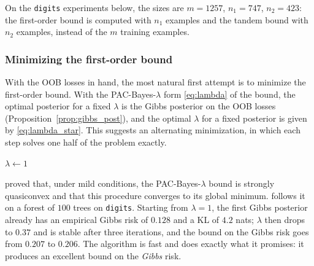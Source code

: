 On the \texttt{digits} experiments below, the sizes are $m=1257$, $n_1=747$, $n_2=423$: the
first-order bound is computed with $n_1$ examples and the tandem bound with $n_2$
examples, instead of the $m$ training examples.

\subsubsection{Minimizing the first-order bound}\label{sec:algo_fo}

With the OOB losses in hand, the most natural first attempt is to minimize the
first-order bound. With the PAC-Bayes-$\lambda$ form \eqref{eq:lambda} of the bound, the optimal
posterior for a fixed $\lambda$ is the Gibbs posterior on the OOB losses
(Proposition~\ref{prop:gibbs_post}), and the optimal $\lambda$ for a fixed posterior
is given by \eqref{eq:lambda_star}. This suggests an alternating minimization,
in which each step solves one half of the problem exactly.

\begin{algorithm}[h]
\caption{PAC-Bayes-$\lambda$ minimization for a forest \citep{thiemann2017strongly}}\label{algo:fo}
$\lambda\leftarrow1$\;
\end{algorithm}

\citet{thiemann2017strongly} proved that, under mild conditions, the
PAC-Bayes-$\lambda$ bound is strongly quasiconvex and that this procedure
converges to its global minimum.  follows it on a forest
of $100$ trees on \texttt{digits}. Starting from $\lambda=1$, the first Gibbs
posterior already has an empirical Gibbs risk of $0.128$ and a KL of $4.2$ nats;
$\lambda$ then drops to $0.37$ and is stable after three iterations, and the
bound on the Gibbs risk goes from $0.207$ to $0.206$. The algorithm is fast and
does exactly what it promises: it produces an excellent bound on the
\emph{Gibbs} risk.

